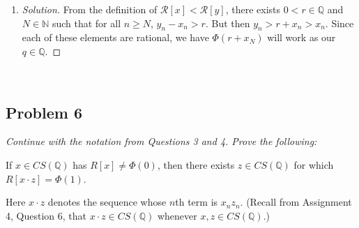 \documentclass{article}
\newcommand{\N}{{\mathbb N}}
\newcommand{\Q}{{\mathbb Q}}
\newcommand{\SR}{{\mathcal R}}
\begin{document}
\begin{enumerate}
\begin{proof}[Solution]
			Now assume that $\SR[x] > \Phi(0)$
			(the case when $\SR[x] < \Phi(0)$ won't be explicitly shown here,
			since the logic is identical and one must only change some signs and inequalities).
			We need now only to find $q \in \Q$ such that $\SR[x] < \Phi(q)$.
			We need that there exists some $0 < r \in \Q$ such that
			there is some $N \in \N$ where for all $n \geq N$,
			$q - x_n > r$
			or that $q - r > x_n$.
			But since $x_n$ is Cauchy, we have shown before it is bounded,
			thus  we can find some $q$ and $r$ such that $q-r > x_n$,
			so we are done.
	\end{proof}
	\item \begin{proof}[Solution]\let\qed\relax
		From the definition of $\SR[x] < \SR[y]$,
		there exists $0 < r \in \Q$ and $N \in \N$
		such that for all $n \geq N$,
		$y_n - x_n > r$.
		But then $y_n > r + x_n > x_n$.
		Since each of these elements are rational, we have $\Phi(r + x_N)$
		will work as our $q \in \Q$.
	\end{proof} 
\end{enumerate}
\clearpage
~\clearpage

\subsection*{Problem 6}
{\it Continue with the notation from Questions 3 and 4. Prove the following:
\begin{center}
	If $x \in CS(\Q)$ has $R[x] \neq \Phi(0)$,
	then there exists $z \in CS(\Q)$ for which $R[x\cdot z] = \Phi(1)$.
\end{center}
Here $x \cdot z$ denotes the sequence whose $n$th term is $x_nz_n$.
(Recall from Assignment 4, Question 6,
that $x\cdot z \in CS(\Q)$ whenever $x,z \in CS(\Q)$.)}
\end{document}
